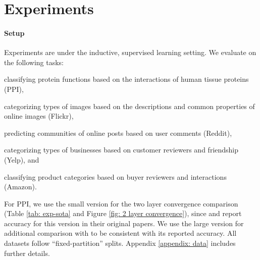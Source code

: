\section{Experiments}


\paragraph{Setup} 
Experiments are under the inductive, supervised learning setting. 
We evaluate {\graphsaint} on the following tasks:
\begin{enumerate*}
    \item classifying protein functions based on the interactions of human tissue proteins (PPI),
    \item categorizing types of images based on the descriptions and common properties of online images (Flickr),
    \item predicting communities of online posts based on user comments (Reddit),
    \item categorizing types of businesses based on customer reviewers and friendship (Yelp), and 
    \item classifying product categories based on buyer reviewers and interactions (Amazon).
\end{enumerate*}
For PPI, we use the small version for the two layer convergence comparison (Table \ref{tab: exp-sota} and Figure \ref{fig: 2 layer convergence}), since \cite{graphsage} and \cite{s-gcn} report accuracy for this version in their original papers. 
We use the large version for additional comparison with \cite{cluster-gcn} to be consistent with its reported accuracy. 
All datasets follow ``fixed-partition'' splits. Appendix \ref{appendix: data} includes further details.

